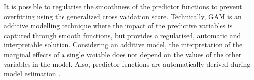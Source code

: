 






It is possible to regularise the smoothness of the predictor functions to prevent overfitting using the generalized cross validation score. Technically, GAM is an additive modelling technique where the impact of the predictive variables is captured through smooth functions, but provides a regularised, automatic and interpretable solution. Considering an additive model, the interpretation of the marginal effects of a single variable does not depend on the values of the other variables in the model. Also, predictor functions are automatically derived during model estimation \citep{larsen_2015}. 


